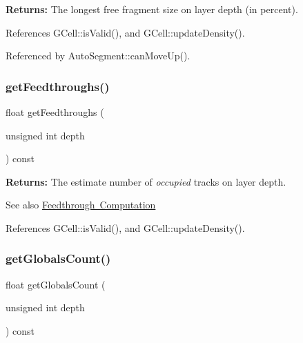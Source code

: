 {\bfseries Returns\+:} The longest free fragment size on layer {\ttfamily depth} (in percent). 

References G\+Cell\+::is\+Valid(), and G\+Cell\+::update\+Density().



Referenced by Auto\+Segment\+::can\+Move\+Up().

\mbox{\label{classKatabatic_1_1GCell_a14feed45699c8dc406251519dc08bc79}} 
\subsubsection{\texorpdfstring{get\+Feedthroughs()}{getFeedthroughs()}}
{\footnotesize\ttfamily float get\+Feedthroughs (\begin{DoxyParamCaption}\item[{unsigned int}]{depth }\end{DoxyParamCaption}) const\hspace{0.3cm}{\ttfamily [inline]}}

{\bfseries Returns\+:} The estimate number of {\itshape occupied} tracks on layer {\ttfamily depth}.

\begin{DoxySeeAlso}{See also}
\mbox{\hyperlink{classKatabatic_1_1GCell_secGCellFeedthrough}{Feedthrough Computation}} 
\end{DoxySeeAlso}


References G\+Cell\+::is\+Valid(), and G\+Cell\+::update\+Density().

\mbox{\label{classKatabatic_1_1GCell_a4785bcc49da76fc38f6940f5b1cc5b17}} 
\subsubsection{\texorpdfstring{get\+Globals\+Count()}{getGlobalsCount()}}
{\footnotesize\ttfamily float get\+Globals\+Count (\begin{DoxyParamCaption}\item[{unsigned int}]{depth }\end{DoxyParamCaption}) const\hspace{0.3cm}{\ttfamily [inline]}}

